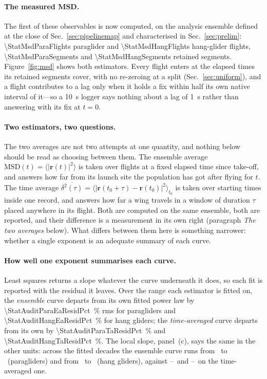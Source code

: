 \begin{revblock}
\paragraph{The measured MSD.}
The first of these observables is now computed, on the analysis ensemble defined at the
close of Sec.~\ref{sec:pipelinemap} and characterised in Sec.~\ref{sec:prelim}:
\num{\StatMsdParaFlights} paraglider and \num{\StatMsdHangFlights} hang-glider flights,
\num{\StatMsdParaSegments} and \num{\StatMsdHangSegments} retained segments.
Figure~\ref{fig:msd} shows both estimators.
Every flight enters at the elapsed times its retained segments cover, with no re-zeroing
at a split (Sec.~\ref{sec:uniform}), and a flight contributes to a lag only when it holds
a fix within half its own native interval of it---so a \SI{10}{\second} logger says
nothing about a lag of \SI{1}{\second} rather than answering with its fix at $t=0$.

\paragraph{Two estimators, two questions.}
The two averages are not two attempts at one quantity, and nothing below should be read as
choosing between them. The ensemble average
$\mathrm{MSD}(t)=\langle|\mathbf{r}(t)|^2\rangle$ is taken over flights at a fixed elapsed
time since take-off, and answers how far from its launch site the population has got after
flying for $t$. The time average
$\overline{\delta^2(\tau)}=\langle|\mathbf{r}(t_0+\tau)-\mathbf{r}(t_0)|^2\rangle_{t_0}$ is
taken over starting times inside one record, and answers how far a wing travels in a
window of duration $\tau$ placed anywhere in its flight. Both are computed on the same
ensemble, both are reported, and their difference is a measurement in its own right
(paragraph \emph{The two averages} below). What differs between them here is something
narrower: whether a single exponent is an adequate summary of each curve.

\paragraph{How well one exponent summarises each curve.}
Least squares returns a slope whatever the curve underneath it does, so each fit is
reported with the residual it leaves. Over the range each estimator is fitted on, the
\emph{ensemble} curve departs from its own fitted power law by
\SI{\StatAuditParaEaResidPct}{\percent} rms for paragliders and
\SI{\StatAuditHangEaResidPct}{\percent} for hang gliders; the \emph{time-averaged} curve
departs from its own by \SI{\StatAuditParaTaResidPct}{\percent} and
\SI{\StatAuditHangTaResidPct}{\percent}. The local slope, panel~(c), says the same in the
other units: across the fitted decades the ensemble curve runs from
\StatAuditParaEaSlopeMin\ to \StatAuditParaEaSlopeMax\ (paragliders) and from
\StatAuditHangEaSlopeMin\ to \StatAuditHangEaSlopeMax\ (hang gliders), against
\StatAuditParaTaSlopeMin--\StatAuditParaTaSlopeMax\ and
\StatAuditHangTaSlopeMin--\StatAuditHangTaSlopeMax\ on the time-averaged one.


\end{revblock}
